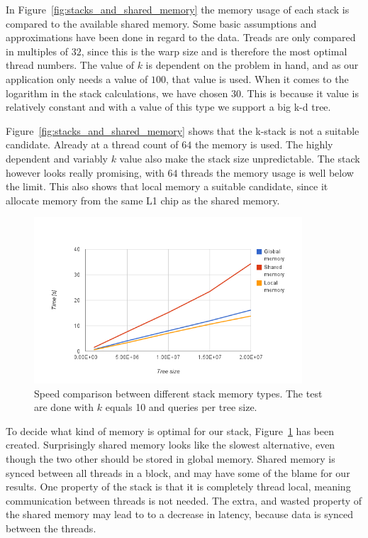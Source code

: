 In Figure~\ref{fig:stacks_and_shared_memory} the memory usage of each stack is compared to the available shared memory. Some basic assumptions and approximations have been done in regard to the data. Treads are only compared in multiples of $32$, since this is the warp size and is therefore the most optimal thread numbers. The value of $k$ is dependent on the problem in hand, and as our application only needs a value of $100$, that value is used. When it comes to the logarithm in the stack calculations, we have chosen $30$.  This is because it value is relatively constant and with a value of this type we support a  big k-d tree.


Figure~\ref{fig:stacks_and_shared_memory} shows that the k-stack is not a suitable candidate. Already at a thread count of $64$ the memory is used. The highly dependent and variably $k$ value also make the stack size unpredictable. The stack however looks really promising, with $64$ threads the memory usage is well below the limit. This also shows that local memory a suitable candidate, since it allocate memory from the same L1 chip as the shared memory.

\begin{figure}[ht!]
    \centering
    \includegraphics[width=100mm]{../gfx/stack_speed.png}

    \caption{Speed comparison between different stack memory types. The test are done with $k$ equals 10 and  queries per tree size. }
    \label{tbl:stack_speed}
\end{figure}



To decide what kind of memory is optimal for our stack, Figure~\ref{tbl:stack_speed} has been created. Surprisingly shared memory looks like the slowest alternative, even though the two other should be stored in global memory. Shared memory is synced between all threads in a block, and may have some of the blame for our results. One property of the stack is that it is completely thread local, meaning communication between threads is not needed. The extra, and wasted property of the shared memory may lead to to a decrease in latency, because data is synced between the threads.

